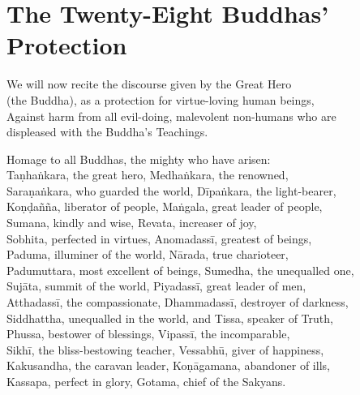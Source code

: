 
\cleartoverso


\chapterTocDelegatePageNumber
\chapter{The Twenty-Eight Buddhas' Protection}

\setTocDelegatedPageNumber

\vspace*{5pt}

{\setlength{\parskip}{0pt}%

\begin{soloonechants}
We will now recite the discourse given by the Great Hero\\
(the Buddha), as a protection for virtue-loving human beings,\\
Against harm from all evil-doing, malevolent non-humans who are\\
displeased with the Buddha's Teachings.\\
\end{soloonechants}%
}

\vspace*{-2pt}

\englishText

\begin{onechants}
Homage to all Buddhas, the mighty who have arisen:\\
Taṇhaṅkara, the great hero, Medhaṅkara, the renowned,\\
Saraṇaṅkara, who guarded the world, Dīpaṅkara, the light-bearer,\\
Koṇḍañña, liberator of people, Maṅgala, great leader of people,\\
Sumana, kindly and wise, Revata, increaser of joy,\\
Sobhita, perfected in virtues, Anomadassī, greatest of beings,\\
Paduma, illuminer of the world, Nārada, true charioteer,\\
Padumuttara, most excellent of beings, Sumedha, the unequalled one,\\
Sujāta, summit of the world,  Piyadassī, great leader of men,\\
Atthadassī, the compassionate, Dhammadassī, destroyer of darkness,\\
Siddhattha, unequalled in the world,  and Tissa, speaker of Truth,\\
Phussa, bestower of blessings, Vipassī, the incomparable,\\
Sikhī, the bliss-bestowing teacher, Vessabhū, giver of happiness,\\
Kakusandha, the caravan leader, Koṇāgamana, abandoner of ills,\\
Kassapa, perfect in glory, Gotama, chief of the Sakyans.\\
\end{onechants}

